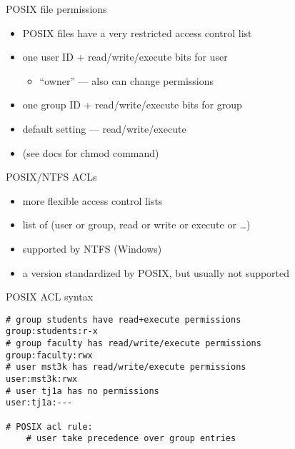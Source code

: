 \begin{frame}{POSIX file permissions}
    \begin{itemize}
    \item POSIX files have a very restricted access control list
    \vspace{.5cm}
    \item one user ID + read/write/execute bits for user
        \begin{itemize}
        \item ``owner'' --- also can change permissions
        \end{itemize}
    \item one group ID + read/write/execute bits for group
    \item default setting --- read/write/execute
    \vspace{.5cm}
    \item (see docs for chmod command)
    \end{itemize}
\end{frame}

\begin{frame}{POSIX/NTFS ACLs}
    \begin{itemize}
    \item more flexible access control lists
    \vspace{.5cm}
    \item list of (user or group, read or write or execute or \ldots)
    \vspace{.5cm}
    \item supported by NTFS (Windows)
    \item a version standardized by POSIX, but usually not supported
    \end{itemize}
\end{frame}

\begin{frame}[fragile,label=posixAclSyntax]{POSIX ACL syntax}
\begin{lstlisting}[language={},style=small]
# group students have read+execute permissions
group:students:r-x
# group faculty has read/write/execute permissions
group:faculty:rwx
# user mst3k has read/write/execute permissions
user:mst3k:rwx
# user tj1a has no permissions
user:tj1a:---

# POSIX acl rule:
    # user take precedence over group entries
\end{lstlisting}
\end{frame}
